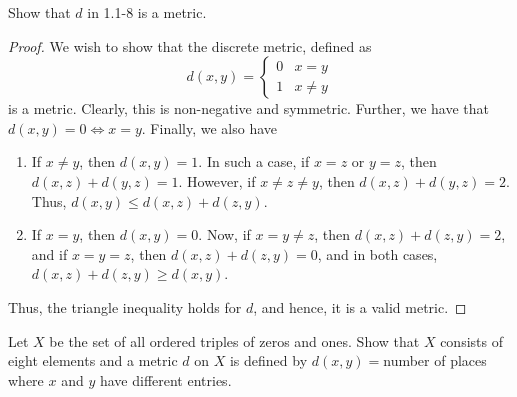 { \begin{question}
     Show that $d$ in 1.1-8 is a metric.
     \label{section1.1-9}
 \end{question}
 \begin{proof}
     We wish to show that the discrete metric, defined as
     \[d(x,y) = 
     \begin{cases}
         0 & x = y
         \\
         1 & x \neq y
     \end{cases}\]
     is a metric. Clearly, this is non-negative and symmetric. Further, we have that $d(x,y) = 0 \iff x = y$. Finally, we also have 
     \begin{enumerate}
         \item If $x \neq y$, then $d(x,y) = 1$. In such a case, if $x = z$ or $y = z$, then $d(x,z) + d(y,z) = 1$. However, if $x \neq z \neq y$, then $d(x,z) + d(y,z) = 2$. Thus, $d(x,y) \leq d(x,z) + d(z,y)$.
         \item If $x = y$, then $d(x,y) = 0$. Now, if $x = y \neq z$, then $d(x,z) + d(z,y) = 2$, and if $x = y = z$, then $d(x,z) + d(z,y) = 0$, and in both cases, $d(x,z) + d(z,y) \geq d(x,y)$.
     \end{enumerate}

     Thus, the triangle inequality holds for $d$, and hence, it is a valid metric.
\end{proof}

\begin{question}
    Let $X$ be the set of all ordered triples of zeros and ones. Show that $X$ consists of eight elements and a metric $d$ on $X$ is defined by $d(x,y) = $number of places where $x$ and $y$ have different entries. 
    \label{section1.1-10}
\end{question}

}
